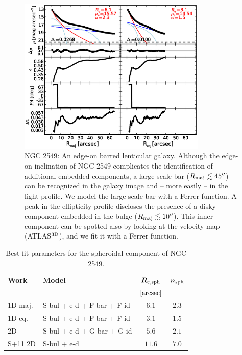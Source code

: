 \documentclass[preprint2]{emulateapj}
\newcommand{\fitfigurewidth}{0.8\textwidth}
\begin{document}
  \begin{figure}[h]
  \begin{center}
  \includegraphics[width=\fitfigurewidth]{images/n2549_1Dfit.eps}
  \caption{NGC 2549: 
  An edge-on barred lenticular galaxy. 
  Although the edge-on inclination of NGC 2549 complicates the identification of additional embedded components, 
  a large-scale bar ($R_{\rm maj} \lesssim 45''$) can be recognized in the galaxy image and -- more easily -- in the light profile.
  We model the large-scale bar with a Ferrer function.
  A peak in the ellipticity profile discloses the presence of a disky component
  embedded in the bulge ($R_{\rm maj} \lesssim 10''$).
  This inner component can be spotted also by looking at the velocity map (ATLAS$^{\rm 3D}$), and 
  we fit it with a Ferrer function.
  }
  \end{center}
  \end{figure}

  \begin{table}[h]
  \small
  \caption{Best-fit parameters for the spheroidal component of NGC 2549.}
  \begin{center}
  \begin{tabular}{llcc}
  \hline
  {\bf Work} & {\bf Model}   & $\bm R_{\rm e,sph}$    & $\bm n_{\rm sph}$ \\
    &  &  $[\rm arcsec]$ & \\
  \hline
  1D maj. & S-bul + e-d + F-bar + F-id & $6.1$  &  $2.3$ \\
  1D eq.  & S-bul + e-d + F-bar + F-id & $3.1$  &  $1.5$ \\
  2D      & S-bul + e-d + G-bar + G-id & $5.6$  &  $2.1$ \\
  \hline
  S+11 2D         & S-bul + e-d & $11.6$  &  $7.0$ \\
  \hline
  \end{tabular}
  \end{center}
  \label{tab:n2549}
  \end{table}
\end{document}

